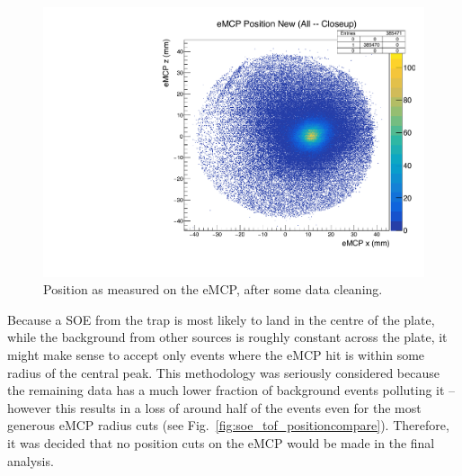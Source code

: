\begin{figure}[h!!!!t!]
	\centering
	\includegraphics[width=.999\linewidth]
	{Figures/eMCP_position.pdf}
	\caption{Position as measured on the eMCP, after some data cleaning.}	
	\label{fig:emcp_position}
\end{figure}

Because a SOE from the trap is most likely to land in the centre of the plate, while the background from other sources is roughly constant across the plate, it might make sense to accept only events where the eMCP hit is within some radius of the central peak.  This methodology was seriously considered because the remaining data has a much lower fraction of background events polluting it -- however this results in a loss of around half of the events even for the most generous eMCP radius cuts (see Fig.~\ref{fig:soe_tof_positioncompare}).  Therefore, it was decided that no position cuts on the eMCP would be made in the final analysis.

